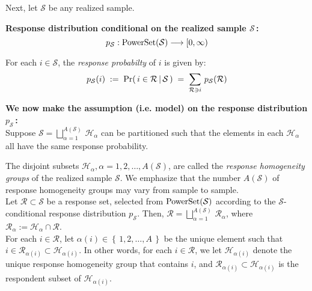 \documentclass{article}
\begin{document}
\noindent
Next, let $\mathcal{S}$ be any realized sample. \\

\vskip 0.8cm
\begin{center}
\begin{minipage}{6in}
\noindent
\textbf{Response distribution conditional on the realized sample $\mathcal{S}$\,:}
\begin{equation*}
p_{\mathcal{S}} : \textnormal{PowerSet}(\mathcal{S}) \longrightarrow [0,\infty)
\end{equation*}

\noindent
For each $i \in \mathcal{S}$, the \emph{response probabilty} of $i$ is given by:
\begin{equation*}
p_{\mathcal{S}}\!\left(i\right)
\; := \;
\textnormal{Pr}\!\left(\,i\in\mathcal{R}\,|\,\mathcal{S}\,\right)
\; = \; 
\sum_{\mathcal{R}\ni i}\,p_{\mathcal{S}}\!\left(\mathcal{R}\right)
\end{equation*}

\noindent
\textbf{We now make the assumption (i.e. model) on the response distribution $p_{\mathcal{S}}$\,:}\\
Suppose $\mathcal{S} = \displaystyle{\bigsqcup_{\alpha=1}^{A(\mathcal{S})}}\,\mathcal{H}_{\alpha}$ can be partitioned such that the elements in each $\mathcal{H}_{\alpha}$ all have the same response probability. \\
\end{minipage}
\end{center}
\vskip 0.5cm

The disjoint subsets $\mathcal{H}_{\alpha}, \alpha=1,2,\ldots,A(\mathcal{S})$, are called the \emph{response homogeneity groups} of the realized sample $\mathcal{S}$.  We emphasize that the number $A(\mathcal{S})$ of response homogeneity groups may vary from sample to sample. \\

Let $\mathcal{R} \subset \mathcal{S}$ be a response set, selected from $\textnormal{PowerSet}(\mathcal{S})$ according to the $\mathcal{S}$-conditional response distribution $p_{\mathcal{S}}$.  Then, $\mathcal{R} = \displaystyle{\bigsqcup_{\alpha=1}^{A(\mathcal{S})}}\,\mathcal{R} _{\alpha}$, where $\mathcal{R}_{\alpha} := \mathcal{H}_{\alpha}\cap\mathcal{R}$. \\

For each $i \in \mathcal{R}$, let $\alpha(i) \in \left\{\,1,2,\ldots,A\,\right\}$ be the unique element such that $i \in \mathcal{R}_{\alpha(i)} \subset  \mathcal{H}_{\alpha(i)}$.  In other words, for each $i \in \mathcal{R}$, we let $\mathcal{H}_{\alpha(i)}$ denote the unique response homogeneity group that contains $i$, and $\mathcal{R}_{\alpha(i)} \subset \mathcal{H}_{\alpha(i)}$ is the respondent subset of $\mathcal{H}_{\alpha(i)}$. \\
\end{document}
